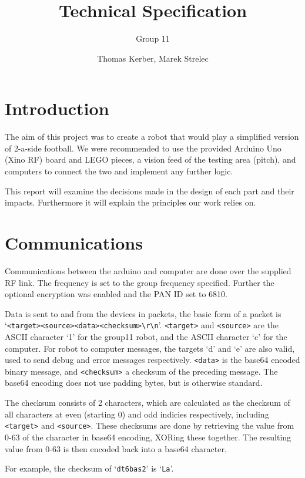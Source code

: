 \documentclass[a4paper]{scrartcl}
\author{Thomas Kerber, Marek Strelec}
\title{Technical Specification}
\subtitle{Group 11}
\begin{document}
\maketitle

\section{Introduction}

The aim of this project was to create a robot that would play a simplified version of 2-a-side football. We were recommended to use the provided Arduino Uno (Xino RF) board and LEGO pieces, a vision feed of the testing area (pitch), and computers to connect the two and implement any further logic.

This report will examine the decisions made in the design of each part and their impacts. Furthermore it will explain the principles our work relies on.

\section{Communications}

Communications between the arduino and computer are done over the supplied RF
link. The frequency is set to the group frequency specified. Further the
optional encryption was enabled and the PAN ID set to 6810.

Data is sent to and from the devices in packets, the basic form of a packet is
`\verb$<target><source><data><checksum>\r\n$'. \texttt{<target>} and
\texttt{<source>} are the ASCII character `1' for the group11 robot, and the
ASCII character `c' for the computer. For robot to computer messages, the
targets `d' and `e' are also valid, used to send debug and error messages
respectively. \texttt{<data>} is the base64 encoded binary message, and
\texttt{<checksum>} a checksum of the preceding message.  The base64 encoding
does not use padding bytes, but is otherwise standard.

The checksum consists of 2 characters, which are calculated as the checksum of
all characters at even (starting 0) and odd indicies respectively, including
\texttt{<target>} and \texttt{<source>}. These checksums are done by retrieving
the value from 0-63 of the character in base64 encoding, XORing these together.
The resulting value from 0-63 is then encoded back into a base64 character.

For example, the checksum of `\texttt{dt6bas2}' is `\texttt{La}'.
\end{document}
